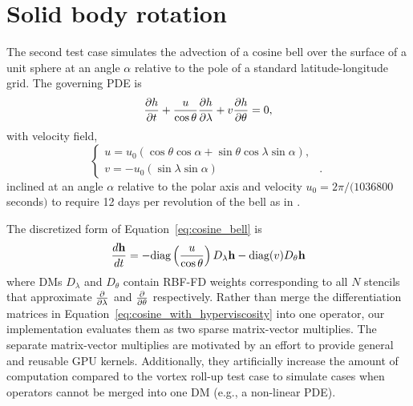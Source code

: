 \documentclass{report}
\begin{document}

\section{Solid body rotation}

The second test case simulates the advection of a cosine bell over the surface of a unit sphere at an angle $\alpha$ relative to the pole of a standard latitude-longitude grid. The governing PDE is
\begin{equation}
\frac{\partial h}{\partial t} + \frac{u}{\cos \theta} \frac{\partial h}{\partial \lambda} + v \frac{\partial h}{\partial \theta} = 0, \label{eq:cosine_bell}
\end{equation}
with velocity field,
\begin{equation*}
\begin{cases}
u =  u_0 (\cos \theta \cos \alpha + \sin \theta \cos \lambda \sin \alpha),  & \\
v =  -u_0(\sin \lambda \sin \alpha) &.
\end{cases}
\end{equation*}
inclined at an angle $\alpha$ relative to the polar axis and velocity $u_0 = 2 \pi / (1036800$ seconds$)$ to require 12 days per revolution of the bell as in \cite{NairTransport05, FlyerWright07}.

The discretized form of Equation~\ref{eq:cosine_bell} is
\begin{equation}
\frac{d \mathbf{h}}{d t} = -\text{diag}\left(\frac{u}{\cos \theta}\right) D_\lambda \mathbf{h} - \text{diag}(v) D_\theta \mathbf{h}
\label{eq:cosine_with_hyperviscosity}
\end{equation}
where DMs $D_\lambda$ and $D_\theta$ contain RBF-FD weights corresponding to all $N$ stencils that approximate $\frac{\partial }{\partial \lambda}$ and $\frac{\partial }{\partial \theta}$ respectively. Rather than merge the differentiation matrices in Equation~\ref{eq:cosine_with_hyperviscosity} into one operator, our implementation evaluates them as two sparse matrix-vector multiplies. The separate matrix-vector multiplies are motivated by an effort to provide general and reusable GPU kernels. Additionally, they artificially increase the amount of computation compared to the vortex roll-up test case to simulate cases when operators cannot be merged into one DM (e.g., a non-linear PDE).
\end{document}
